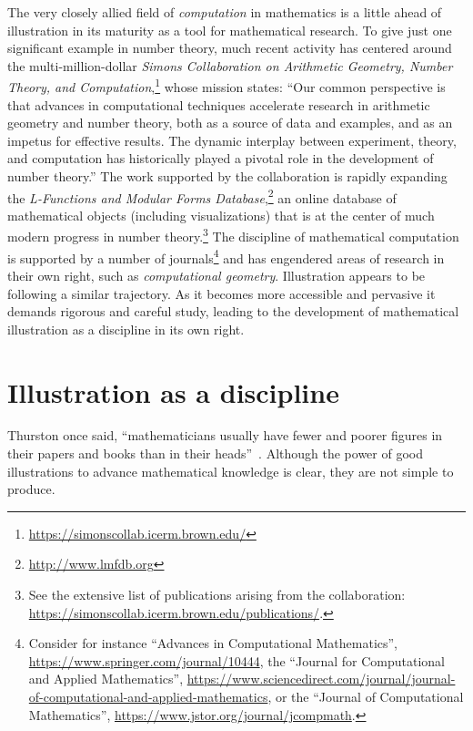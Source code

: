 \documentclass{notices}
\begin{document}
The very closely allied field of \emph{computation} in mathematics is a little ahead of illustration in its maturity as a tool for mathematical research. To give just one significant example in number theory, much recent activity has centered around the multi-million-dollar \emph{Simons Collaboration on Arithmetic Geometry, Number Theory, and Computation},\footnote{\url{https://simonscollab.icerm.brown.edu/}} whose mission states: ``Our common perspective is that advances in computational techniques accelerate research in arithmetic geometry and number theory, both as a source of data and examples, and as an impetus for effective results. The dynamic interplay between experiment, theory, and computation has historically played a pivotal role in the development of number theory.'' The work supported by the collaboration is rapidly expanding the \textit{L-Functions and Modular Forms Database},\footnote{\url{http://www.lmfdb.org}} an online database of mathematical objects (including visualizations) that is at the center of much modern progress in number theory.\footnote{See the extensive list of publications arising from the collaboration: \url{https://simonscollab.icerm.brown.edu/publications/}.}  The discipline of mathematical computation is supported by a number of journals\footnote{Consider for instance ``Advances in Computational Mathematics'', \url{https://www.springer.com/journal/10444}, the ``Journal for Computational and Applied Mathematics'', \url{https://www.sciencedirect.com/journal/journal-of-computational-and-applied-mathematics}, or the ``Journal of Computational Mathematics'', \url{https://www.jstor.org/journal/jcompmath}.} and has engendered areas of research in their own right, such as \emph{computational geometry}. %
Illustration appears to be following a similar trajectory.  As it becomes more accessible and pervasive it demands rigorous and careful study, leading to the development of mathematical illustration as a discipline in its own right.

\section*{Illustration as a discipline}

Thurston once said, ``mathematicians usually have fewer and poorer figures in their papers and books than in their heads''~\cite{thur94}.  
Although the power of good illustrations to advance mathematical knowledge is clear, they are not simple to produce.
\end{document}
